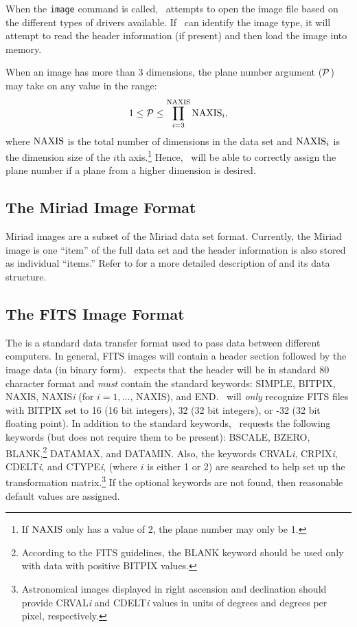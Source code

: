 When the {\tt image} command is called,
\wip\ attempts to open the image file based
on the different types of drivers available.
If \wip\ can identify the image type, it will attempt to read the header
information (if present) and then load the image into memory.

When an image has more than 3 dimensions,
the plane number argument ($\cal P$) may take on any value in the range:
\[ 1 \leq {\cal P} \leq \prod_{i=3}^{\rm NAXIS} {\rm NAXIS}_{i}, \]
where ${\rm NAXIS}$ is the total number of dimensions in the data set
and ${\rm NAXIS}_{i}$ is the dimension size of the $i$th axis.\footnote{If
${\rm NAXIS}$ only has a value of 2, the plane number may only be 1.}
Hence, \wip\ will be able to correctly assign the plane number
if a plane from a higher dimension is desired.

\subsection*		{The Miriad Image Format}

Miriad
images are a subset of the Miriad data set format.
Currently, the Miriad image is one ``item'' of the full data set and the
header information is also stored as individual ``items.''
Refer to
for a more detailed description of
and its data structure.

\subsection*		{The FITS Image Format}

The %
is a standard data transfer format used to pass data
between different computers.
In general, FITS images will contain a header section followed by the
image data (in binary form).
\wip\ expects that the header will be in standard 80 character format and
{\em must} contain the standard keywords: SIMPLE, BITPIX, NAXIS,
NAXIS{\it i} (for $i = 1, \dots$, NAXIS), and END.
\wip\ will {\em only} recognize FITS files with
BITPIX set to 16 (16 bit integers), 32 (32 bit integers),
or -32 (32 bit floating point).
In addition to the standard keywords,
\wip\ requests the following keywords
(but does not require them to be present):
BSCALE, BZERO, BLANK,\footnote{According to the FITS guidelines,
the BLANK keyword should be used only with data with positive BITPIX values.}
DATAMAX, and DATAMIN.
Also, the keywords
CRVAL{\it i},
CRPIX{\it i},
CDELT{\it i},
and
CTYPE{\it i}, (where $i$ is either 1 or 2)
are searched to help set up the transformation matrix.\footnote{Astronomical
images displayed in right ascension and
declination should provide CRVAL{\it i} and CDELT{\it i} values in
units of degrees and degrees per pixel, respectively.}
If the optional keywords are not found,
then reasonable default values are assigned.

